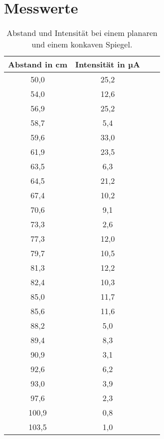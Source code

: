\section{Messwerte}
\label{sec:Messwerte}


      \begin{table}
        \centering
        \begin{tabular}{c c c c}
          \toprule
          Abstand in cm & Intensität in µA\\
          \midrule
              50,0  &    25,2\\
              54,0  &    12,6\\
              56,9  &  25,2\\
              58,7  &  5,4\\
              59,6  &  33,0\\
              61,9  &  23,5\\
              63,5  &  6,3\\
              64,5  &  21,2\\
              67,4  &  10,2\\
              70,6  &  9,1\\
              73,3  &  2,6\\
              77,3  &  12,0\\
              79,7  &  10,5\\
              81,3  &  12,2\\
              82,4  &  10,3\\
              85,0  &  11,7\\
              85,6  &  11,6\\
              88,2  &  5,0\\
              89,4  &  8,3\\
              90,9  &  3,1\\
              92,6  &  6,2\\
              93,0  &  3,9\\
              97,6  &  2,3\\
              100,9 &  0,8\\
              103,5 &  1,0\\
          \bottomrule
        \end{tabular}
        \caption{Abstand und Intensität bei einem planaren und einem konkaven Spiegel.}
        \label{tab:planarkonkav}
      \end{table}

